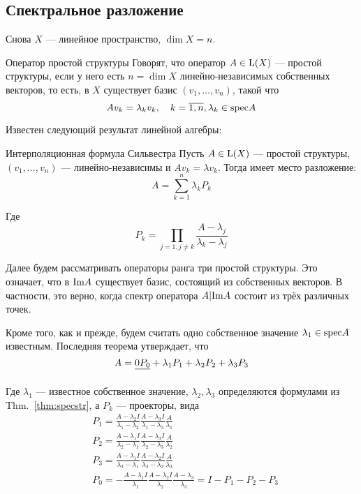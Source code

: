 \subsection{Спектральное разложение}
Снова $X$ --- линейное пространство, $\dim X = n$.
\begin{dfn}{Оператор простой структуры}
  Говорят, что оператор $A\in\mathrm{L}(X)$ --- простой структуры,
  если у него есть $n=\dim X$ линейно-независимых собственных векторов,
  то есть, в $X$ существует базис $(v_1, \ldots, v_n)$, такой что
  $$A v_k = \lambda_k v_k, \quad k=\overline{1,n}, \lambda_k\in\mathrm{spec} A$$
\end{dfn}

Известен следующий результат линейной алгебры:
\begin{thm}{Интерполяционная формула Сильвестра}
  Пусть $A\in\mathrm{L}(X)$ --- простой структуры,
  $(v_1, \ldots, v_n)$ --- линейно-независимы
  и $A v_k = \lambda v_k$.
  Тогда имеет место разложение:
  $$A = \sum_{k=1}^n \lambda_k P_k$$

  Где
  $$P_k = \prod_{j=1,j\neq k} \frac{A - \lambda_j}{\lambda_k - \lambda_j}$$
\end{thm}

Далее будем рассматривать операторы ранга три простой структуры.
Это означает, что в $\mathrm{Im} A$ существует базис, состоящий из собственных векторов.
В частности, это верно, когда спектр оператора $A|\mathrm{Im} A$ состоит из трёх различных точек.

Кроме того, как и прежде, будем считать одно собственное значение $\lambda_1\in\mathrm{spec} A$ известным.
Последняя теорема утверждает, что
$$A = \sout{0 P_0} + \lambda_1 P_1 + \lambda_2 P_2 + \lambda_3 P_3$$

Где $\lambda_1$ --- известное собственное значение,
$\lambda_2, \lambda_3$ определяются формулами из Thm.~\ref{thm:specstr},
а $P_k$ --- проекторы, вида
$$\begin{aligned}
  & P_1 = \frac{A - \lambda_2 I}{\lambda_1 - \lambda_2}\frac{A - \lambda_3 I}{\lambda_1 - \lambda_3}\frac{A}{\lambda_1} \\
  & P_2 = \frac{A - \lambda_1 I}{\lambda_2 - \lambda_1}\frac{A - \lambda_3 I}{\lambda_2 - \lambda_3}\frac{A}{\lambda_2} \\
  & P_3 = \frac{A - \lambda_1 I}{\lambda_3 - \lambda_1}\frac{A - \lambda_2 I}{\lambda_3 - \lambda_2}\frac{A}{\lambda_3} \\
  & P_0 = - \frac{A - \lambda_1 I}{\lambda_1}\frac{A - \lambda_2 I}{\lambda_2}\frac{A - \lambda_3}{\lambda_3} = I - P_1 - P_2 - P_3 \\
\end{aligned}$$

